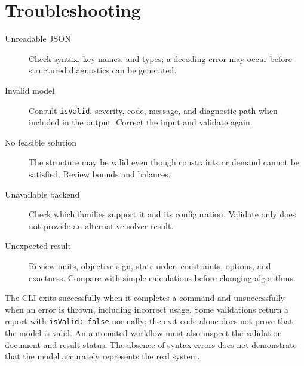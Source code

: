 \section{Troubleshooting}
\begin{description}
 \item[Unreadable JSON] Check syntax, key names, and types; a decoding error
 may occur before structured diagnostics can be generated.
 \item[Invalid model] Consult \texttt{isValid}, severity, code, message, and
 diagnostic path when included in the output. Correct the input and validate again.
 \item[No feasible solution] The structure may be valid even though constraints
 or demand cannot be satisfied. Review bounds and balances.
 \item[Unavailable backend] Check which families support it and its
 configuration. Validate only does not provide an alternative solver result.
 \item[Unexpected result] Review units, objective sign, state order,
 constraints, options, and exactness. Compare with simple calculations before
 changing algorithms.
\end{description}
The CLI exits successfully when it completes a command and unsuccessfully when
an error is thrown, including incorrect usage. Some validations return a report
with \texttt{isValid: false} normally; the exit code alone does not prove that
the model is valid. An automated workflow must also inspect the validation
document and result status. The absence of syntax errors does not demonstrate
that the model accurately represents the real system.
